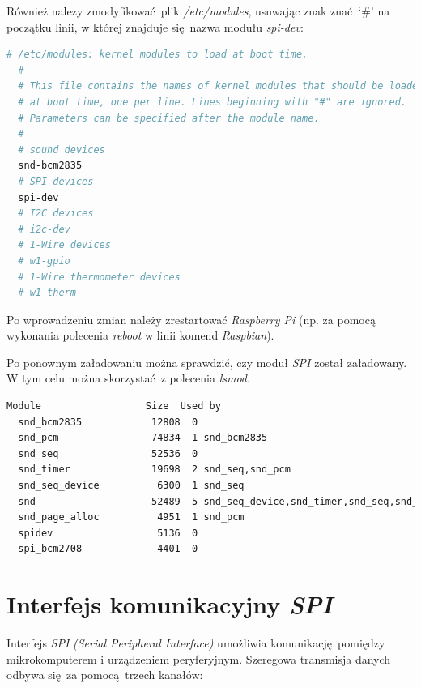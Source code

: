 \documentclass[eng,printmode]{mgr}
\begin{document}
Również nalezy zmodyfikować plik \emph{/etc/modules}, usuwając znak znać `\#' na początku linii, w której znajduje się nazwa modułu \emph{spi-dev}:
\vspace{0.5cm}

\begin{minipage}{\textwidth}
  \begin{lstlisting}[language=bash,frame=single,caption={Zmodyfikowany plik \emph{/etc/modules}}]
  # /etc/modules: kernel modules to load at boot time.  
  #  
  # This file contains the names of kernel modules that should be loaded  
  # at boot time, one per line. Lines beginning with "#" are ignored.  
  # Parameters can be specified after the module name.  
  #  
  # sound devices  
  snd-bcm2835  
  # SPI devices  
  spi-dev  
  # I2C devices  
  # i2c-dev  
  # 1-Wire devices  
  # w1-gpio  
  # 1-Wire thermometer devices  
  # w1-therm 
  \end{lstlisting} 
\end{minipage}

Po wprowadzeniu zmian należy zrestartować \emph{Raspberry Pi} (np. za pomocą wykonania polecenia \emph{reboot} w linii komend \emph{Raspbian}). 

Po ponownym załadowaniu można sprawdzić, czy moduł \emph{SPI} został załadowany. W tym celu można skorzystać z polecenia \emph{lsmod}.
\vspace{0.5cm}

  \begin{lstlisting}[language=bash,frame=single,caption={Wynik wykonania polecenia \emph{lsmod}}]
  Module                  Size  Used by
  snd_bcm2835            12808  0
  snd_pcm                74834  1 snd_bcm2835
  snd_seq                52536  0
  snd_timer              19698  2 snd_seq,snd_pcm
  snd_seq_device          6300  1 snd_seq
  snd                    52489  5 snd_seq_device,snd_timer,snd_seq,snd_pcm,snd_bcm2835
  snd_page_alloc          4951  1 snd_pcm
  spidev                  5136  0
  spi_bcm2708             4401  0
  \end{lstlisting} 

\section{Interfejs komunikacyjny \emph{SPI}}

Interfejs \emph{SPI} \emph{(Serial Peripheral Interface)} umożliwia komunikację pomiędzy mikrokomputerem i urządzeniem peryferyjnym. Szeregowa transmisja danych odbywa się za pomocą trzech kanałów:
\end{document}
